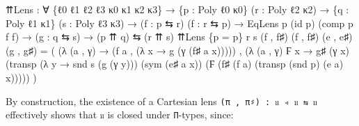 \documentclass[
  11pt,
  oneside,
  article]{memoir}
\newenvironment{Shaded}{}{}
\newcommand{\NormalTok}[1]{#1}
\newcommand{\OtherTok}[1]{\textcolor[rgb]{0.00,0.44,0.13}{#1}}
\theoremstyle{definition}
\theoremstyle{plain}
\newcommand{\0}{\textsf{0}}
\newcommand{\1}{\tn{\textsf{1}}}
\begin{document}
\begin{Shaded}
\begin{Highlighting}[]
\NormalTok{⇈Lens }\OtherTok{:} \OtherTok{∀} \OtherTok{\{}\NormalTok{ℓ0 ℓ1 ℓ2 ℓ3 κ0 κ1 κ2 κ3}\OtherTok{\}}
        \OtherTok{→} \OtherTok{\{}\NormalTok{p }\OtherTok{:}\NormalTok{ Poly ℓ0 κ0}\OtherTok{\}} \OtherTok{(}\NormalTok{r }\OtherTok{:}\NormalTok{ Poly ℓ2 κ2}\OtherTok{)}
        \OtherTok{→} \OtherTok{\{}\NormalTok{q }\OtherTok{:}\NormalTok{ Poly ℓ1 κ1}\OtherTok{\}} \OtherTok{(}\NormalTok{s }\OtherTok{:}\NormalTok{ Poly ℓ3 κ3}\OtherTok{)}
        \OtherTok{→} \OtherTok{(}\NormalTok{f }\OtherTok{:}\NormalTok{ p ⇆ r}\OtherTok{)} \OtherTok{(}\NormalTok{f\textquotesingle{} }\OtherTok{:}\NormalTok{ r ⇆ p}\OtherTok{)} 
        \OtherTok{→}\NormalTok{ EqLens p }\OtherTok{(}\NormalTok{id p}\OtherTok{)} \OtherTok{(}\NormalTok{comp p f f\textquotesingle{}}\OtherTok{)}
        \OtherTok{→} \OtherTok{(}\NormalTok{g }\OtherTok{:}\NormalTok{ q ⇆ s}\OtherTok{)} \OtherTok{→} \OtherTok{(}\NormalTok{p ⇈ q}\OtherTok{)}\NormalTok{ ⇆ }\OtherTok{(}\NormalTok{r ⇈ s}\OtherTok{)}
\NormalTok{⇈Lens }\OtherTok{\{}\NormalTok{p }\OtherTok{=}\NormalTok{ p}\OtherTok{\}}\NormalTok{ r s }\OtherTok{(}\NormalTok{f , f♯}\OtherTok{)} \OtherTok{(}\NormalTok{f\textquotesingle{} , f\textquotesingle{}♯}\OtherTok{)} \OtherTok{(}\NormalTok{e , e♯}\OtherTok{)} \OtherTok{(}\NormalTok{g , g♯}\OtherTok{)} \OtherTok{=} 
    \OtherTok{(} \OtherTok{(λ} \OtherTok{(}\NormalTok{a , γ}\OtherTok{)} \OtherTok{→} \OtherTok{(}\NormalTok{f a , }\OtherTok{(λ}\NormalTok{ x }\OtherTok{→}\NormalTok{ g }\OtherTok{(}\NormalTok{γ }\OtherTok{(}\NormalTok{f♯ a x}\OtherTok{)))))}
\NormalTok{    , }\OtherTok{(λ} \OtherTok{(}\NormalTok{a , γ}\OtherTok{)}\NormalTok{ Ϝ x }\OtherTok{→} 
\NormalTok{         g♯ }\OtherTok{(}\NormalTok{γ x}\OtherTok{)} 
            \OtherTok{(}\NormalTok{transp }\OtherTok{(λ}\NormalTok{ y }\OtherTok{→}\NormalTok{ snd s }\OtherTok{(}\NormalTok{g }\OtherTok{(}\NormalTok{γ y}\OtherTok{)))} 
                    \OtherTok{(}\NormalTok{sym }\OtherTok{(}\NormalTok{e♯ a x}\OtherTok{))} 
                    \OtherTok{(}\NormalTok{Ϝ }\OtherTok{(}\NormalTok{f\textquotesingle{}♯ }\OtherTok{(}\NormalTok{f a}\OtherTok{)} \OtherTok{(}\NormalTok{transp }\OtherTok{(}\NormalTok{snd p}\OtherTok{)} \OtherTok{(}\NormalTok{e a}\OtherTok{)}\NormalTok{ x}\OtherTok{)))))} \OtherTok{)}
\end{Highlighting}
\end{Shaded}

By construction, the existence of a Cartesian lens
\texttt{(π\ ,\ π♯)\ :\ 𝔲\ ◃\ 𝔲\ ⇆\ 𝔲} effectively shows that \texttt{𝔲}
is closed under \texttt{Π}-types, since:
\end{document}
